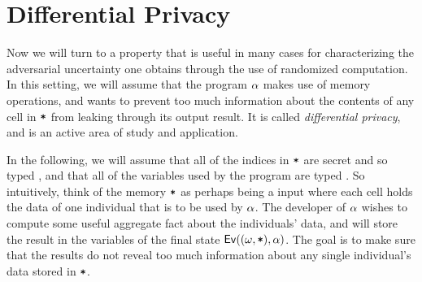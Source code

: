 \documentclass[11pt,twoside]{scrartcl}
\begin{document}
\section{Differential Privacy}

Now we will turn to a property that is useful in many cases for characterizing the adversarial uncertainty one obtains through the use of randomized computation. In this setting, we will assume that the program $\alpha$ makes use of memory operations, and wants to prevent too much information about the contents of any cell in $\texttt{\upshape *}$ from leaking through its output result. It is called \emph{differential privacy}, and is an active area of study and application.

In the following, we will assume that all of the indices in $\texttt{\upshape *}$ are secret and so typed \hisec, and that all of the variables used by the program are typed \lowsec. So intuitively, think of the memory $\texttt{\upshape *}$ as perhaps being a input where each cell holds the data of one individual that is to be used by $\alpha$. The developer of $\alpha$ wishes to compute some useful aggregate fact about the individuals' data, and will store the result in the variables of the final state $\mathsf{Ev}((\omega,\texttt{\upshape *}),\alpha)$. The goal is to make sure that the results do not reveal too much information about any single individual's data stored in $\texttt{\upshape *}$.
\end{document}

